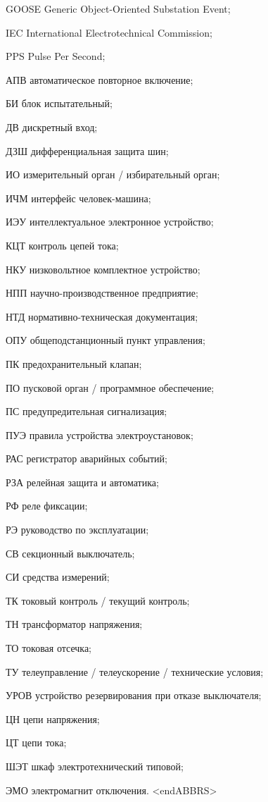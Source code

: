 \begin{list}{}%
{%
  \setlength{\labelwidth}{\abbrwidth}%
  \setlength{\labelsep}{0pt}%
  \setlength{\leftmargin}{\dimexpr\labelwidth+\labelsep\relax}%
  \setlength{\itemindent}{0pt}%
  \setlength{\parsep}{0pt}%
  \setlength{\itemsep}{0pt}
  \renewcommand{\makelabel}[1]{#1 --\hspace{\abbrgap}}%
}
\item[GOOSE] Generic Object-Oriented Substation Event;
\item[IEC]  International Electrotechnical Commission;
\item[PPS] Pulse Per Second;
\item[АПВ] автоматическое повторное включение;
\item[БИ] блок испытательный;
\item[ДВ] дискретный вход;
\item[ДЗШ] дифференциальная защита шин;
\item[ИО] измерительный орган / избирательный орган;
\item[ИЧМ] интерфейс человек-машина;
\item[ИЭУ] интеллектуальное электронное устройство;
\item[КЦТ] контроль цепей тока;
\item[НКУ] низковольтное комплектное устройство;
\item[НПП] научно-производственное предприятие;
\item[НТД] нормативно-техническая документация;
\item[ОПУ] общеподстанционный пункт управления;
\item[ПК] предохранительный клапан;
\item[ПО] пусковой орган / программное обеспечение;
\item[ПС] предупредительная сигнализация;
\item[ПУЭ] правила устройства электроустановок;
\item[РАС] регистратор аварийных событий;
\item[РЗА] релейная защита и автоматика;
\item[РФ] реле фиксации;
\item[РЭ] руководство по эксплуатации;
\item[СВ] секционный выключатель;
\item[СИ] средства измерений;
\item[ТК] токовый контроль / текущий контроль;
\item[ТН] трансформатор напряжения;
\item[ТО] токовая отсечка;
\item[ТУ] телеуправление / телеускорение / технические условия;
\item[УРОВ] устройство резервирования при отказе выключателя;
\item[ЦН] цепи напряжения;
\item[ЦТ] цепи тока;
\item[ШЭТ] шкаф электротехнический типовой;
\item[ЭМО] электромагнит отключения.
{\color{white}\fontsize{0.1pt}{0.1pt}\selectfont<endABBRS>}
\end{list}
